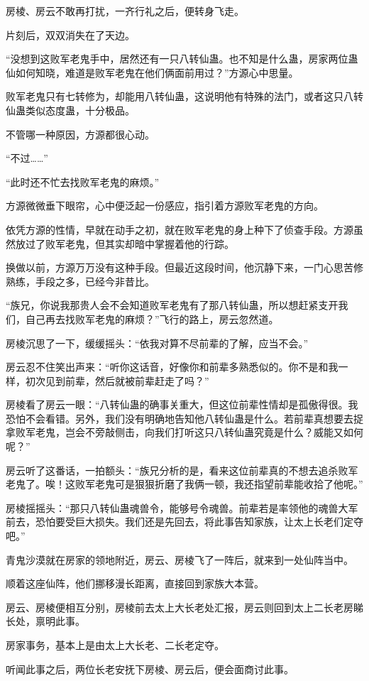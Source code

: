 \begin{this_body}
房棱、房云不敢再打扰，一齐行礼之后，便转身飞走。

片刻后，双双消失在了天边。

“没想到这败军老鬼手中，居然还有一只八转仙蛊。也不知是什么蛊，房家两位蛊仙如何知晓，难道是败军老鬼在他们俩面前用过？”方源心中思量。

败军老鬼只有七转修为，却能用八转仙蛊，这说明他有特殊的法门，或者这只八转仙蛊类似态度蛊，十分极品。

不管哪一种原因，方源都很心动。

“不过……”

“此时还不忙去找败军老鬼的麻烦。”

方源微微垂下眼帘，心中便泛起一份感应，指引着方源败军老鬼的方向。

依凭方源的性情，早就在动手之初，就在败军老鬼的身上种下了侦查手段。方源虽然放过了败军老鬼，但其实却暗中掌握着他的行踪。

换做以前，方源万万没有这种手段。但最近这段时间，他沉静下来，一门心思苦修熟练，手段之多，已经今非昔比。

“族兄，你说我那贵人会不会知道败军老鬼有了那八转仙蛊，所以想赶紧支开我们，自己再去找败军老鬼的麻烦？”飞行的路上，房云忽然道。

房棱沉思了一下，缓缓摇头：“依我对算不尽前辈的了解，应当不会。”

房云忍不住笑出声来：“听你这话音，好像你和前辈多熟悉似的。你不是和我一样，初次见到前辈，然后就被前辈赶走了吗？”

房棱看了房云一眼：“八转仙蛊的确事关重大，但这位前辈性情却是孤傲得很。我恐怕不会看错。另外，我们没有明确地告知他八转仙蛊是什么。若前辈真想要去捉拿败军老鬼，岂会不旁敲侧击，向我们打听这只八转仙蛊究竟是什么？威能又如何呢？”

房云听了这番话，一拍额头：“族兄分析的是，看来这位前辈真的不想去追杀败军老鬼了。唉！这败军老鬼可是狠狠折磨了我俩一顿，我还指望前辈能收拾了他呢。”

房棱摇摇头：“那只八转仙蛊魂兽令，能够号令魂兽。前辈若是率领他的魂兽大军前去，恐怕要受巨大损失。我们还是先回去，将此事告知家族，让太上长老们定夺吧。”

青鬼沙漠就在房家的领地附近，房云、房棱飞了一阵后，就来到一处仙阵当中。

顺着这座仙阵，他们挪移漫长距离，直接回到家族大本营。

房云、房棱便相互分别，房棱前去太上大长老处汇报，房云则回到太上二长老房睇长处，禀明此事。

房家事务，基本上是由太上大长老、二长老定夺。

听闻此事之后，两位长老安抚下房棱、房云后，便会面商讨此事。


\end{this_body}
